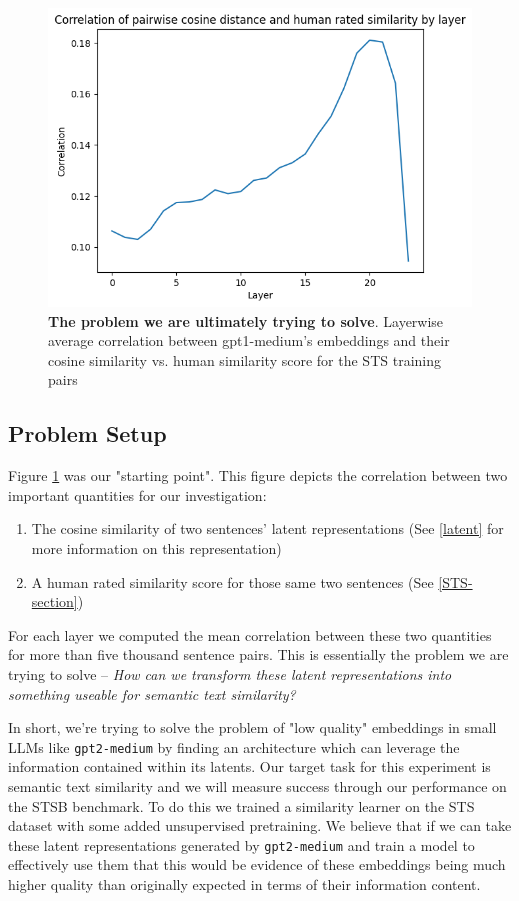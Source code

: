 \documentclass[14pt]{article}
\begin{document}
\begin{figure}[!htb]
    \centering
    \includegraphics[width=0.5\linewidth]{raw_cosine_sim.png}
    \caption{\textbf{The problem we are ultimately trying to solve}. Layerwise average correlation between gpt1-medium's embeddings and their cosine similarity vs. human similarity score for the STS training pairs}
    \label{fig:raw-corr}
\end{figure}

\subsection{Problem Setup} \label{Setup}
Figure \ref{fig:raw-corr} was our "starting point". This figure depicts the correlation between two important quantities for our investigation:
\begin{enumerate}
    \item The cosine similarity of two sentences' latent representations (See \ref{latent} for more information on this representation)
    \item A human rated similarity score for those same two sentences (See \ref{STS-section})
\end{enumerate}
For each layer we computed the mean correlation between these two quantities for more than five thousand sentence pairs. This is essentially the problem we are trying to solve -- \textit{How can we transform these latent representations into something useable for semantic text similarity?}

In short, we're trying to solve the problem of "low quality" embeddings in small LLMs like \verb|gpt2-medium| by finding an architecture which can leverage the information contained within its latents. Our target task for this experiment is semantic text similarity and we will measure success through our performance on the STSB \cite{STS} benchmark. To do this we trained a similarity learner on the STS dataset with some added unsupervised pretraining. We believe that if we can take these latent representations generated by \verb|gpt2-medium| and train a model to effectively use them that this would be evidence of these embeddings being much higher quality than originally expected in terms of their information content.
\end{document}
